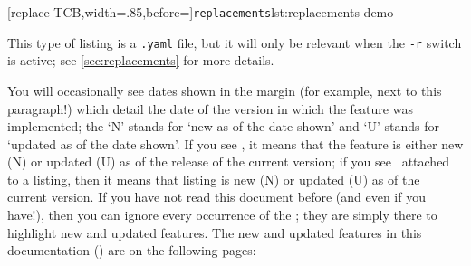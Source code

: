 	\begin{minipage}{.55\textwidth}
		[replace-TCB,width=.85\linewidth,before=\centering]{\texttt{replacements}}{lst:replacements-demo}
	\end{minipage}%
	\hfill
	\begin{minipage}{.4\textwidth}
		This type of listing is a \texttt{.yaml} file, but it will only
		be relevant when the \texttt{-r} switch is active; see \vref{sec:replacements}
		for more details.
	\end{minipage}%

	You will occasionally see dates shown in the margin (for example, next to this
	paragraph!)%
	 which detail
	the date of the version in which the feature was implemented; the `N' stands for `new as
	of the date shown' and `U' stands for `updated as of the date shown'. If you see
	\stardemo, it means that the feature is either new (N) or updated (U) as of the release
	of the current version; if you see \stardemo\, attached to a listing, then it means that
	listing is new (N) or updated (U) as of the current version. If you have not read this
	document before (and even if you have!), then you can ignore every occurrence of the
	\stardemo; they are simply there to highlight new and updated features. The new and
	updated features in this documentation (\gitRel) are on the following pages:
	\listOfNewFeatures %

